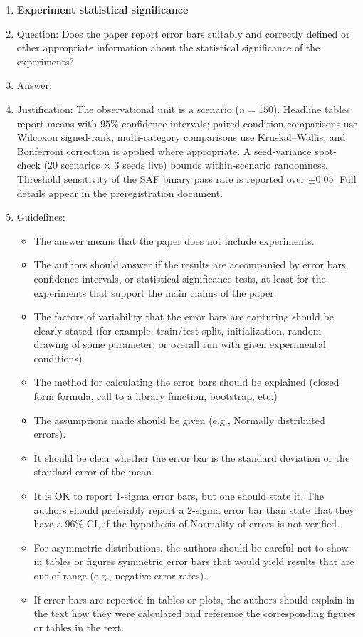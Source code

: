 \begin{enumerate}
\item {\bf Experiment statistical significance}
    \item[] Question: Does the paper report error bars suitably and correctly defined or other appropriate information about the statistical significance of the experiments?
    \item[] Answer: \answerYes{}
    \item[] Justification: The observational unit is a scenario ($n=150$). Headline tables report means with $95\%$ confidence intervals; paired condition comparisons use Wilcoxon signed-rank, multi-category comparisons use Kruskal--Wallis, and Bonferroni correction is applied where appropriate. A seed-variance spot-check ($20$ scenarios $\times$ $3$ seeds live) bounds within-scenario randomness. Threshold sensitivity of the SAF binary pass rate is reported over $\pm 0.05$. Full details appear in the preregistration document.
    \item[] Guidelines:
    \begin{itemize}
        \item The answer \answerNA{} means that the paper does not include experiments.
        \item The authors should answer \answerYes{} if the results are accompanied by error bars, confidence intervals, or statistical significance tests, at least for the experiments that support the main claims of the paper.
        \item The factors of variability that the error bars are capturing should be clearly stated (for example, train/test split, initialization, random drawing of some parameter, or overall run with given experimental conditions).
        \item The method for calculating the error bars should be explained (closed form formula, call to a library function, bootstrap, etc.)
        \item The assumptions made should be given (e.g., Normally distributed errors).
        \item It should be clear whether the error bar is the standard deviation or the standard error of the mean.
        \item It is OK to report 1-sigma error bars, but one should state it. The authors should preferably report a 2-sigma error bar than state that they have a 96\% CI, if the hypothesis of Normality of errors is not verified.
        \item For asymmetric distributions, the authors should be careful not to show in tables or figures symmetric error bars that would yield results that are out of range (e.g., negative error rates).
        \item If error bars are reported in tables or plots, the authors should explain in the text how they were calculated and reference the corresponding figures or tables in the text.
    \end{itemize}


\end{enumerate}
